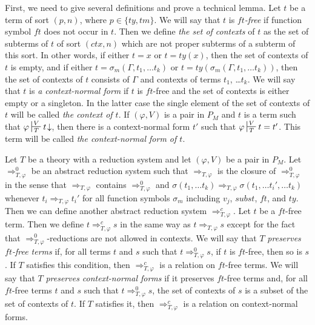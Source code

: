 \documentclass[reqno]{amsart}
\theoremstyle{definition}
\theoremstyle{remark}
\newcommand{\subst}{\mathit{subst}}
\newcommand{\ft}{\mathit{ft}}
\newcommand{\ty}{\mathit{ty}}
\newcommand{\ctx}{\mathit{ctx}}
\newcommand{\tm}{\mathit{tm}}
\numberwithin{figure}{section}
\begin{document}
First, we need to give several definitions and prove a technical lemma.
Let $t$ be a term of sort $(p,n)$, where $p \in \{ \ty, \tm \}$.
We will say that $t$ is \emph{$\ft$-free} if function symbol $\ft$ does not occur in $t$.
Then we define \emph{the set of contexts} of $t$ as the set of subterms of $t$ of sort $(\ctx,n)$ which are not proper subterms of a subterm of this sort.
In other words, if either $t = x$ or $t = \ty(x)$, then the set of contexts of $t$ is empty,
and if either $t = \sigma_m(\Gamma, t_1, \ldots t_k)$ or $t = \ty(\sigma_m(\Gamma, t_1, \ldots t_k))$, then the set of contexts of $t$ consists of $\Gamma$ and contexts of terms $t_1$, \ldots $t_k$.
We will say that $t$ is \emph{a context-normal form} if $t$ is $\ft$-free and the set of contexts is either empty or a singleton.
In the latter case the single element of the set of contexts of $t$ will be called \emph{the context of $t$}.
If $(\varphi,V)$ is a pair in $P_M$ and $t$ is a term such that $\varphi \sststile{T}{V} t\!\downarrow$, then there is a context-normal form $t'$ such that $\varphi \sststile{T}{V} t = t'$.
This term will be called \emph{the context-normal form of $t$}.

Let $T$ be a theory with a reduction system and let $(\varphi,V)$ be a pair in $P_M$.
Let $\Rightarrow_{T,\varphi}^0$ be an abstract reduction system such that $\Rightarrow_{T,\varphi}$ is the closure of $\Rightarrow_{T,\varphi}^0$ in the sense that $\Rightarrow_{T,\varphi}$ contains $\Rightarrow_{T,\varphi}^0$
and $\sigma(t_1, \ldots t_k) \Rightarrow_{T,\varphi} \sigma(t_1, \ldots t_i', \ldots t_k)$ whenever $t_i \Rightarrow_{T,\varphi} t_i'$ for all function symbols $\sigma_m$ including $v_j$, $\subst$, $\ft$, and $\ty$.
Then we can define another abstract reduction system $\Rightarrow_{T,\varphi}^c$.
Let $t$ be a $\ft$-free term.
Then we define $t \Rightarrow_{T,\varphi}^c s$ in the same way as $t \Rightarrow_{T,\varphi} s$ except for the fact that $\Rightarrow_{T,\varphi}^0$-reductions are not allowed in contexts.
We will say that $T$ \emph{preserves $\ft$-free terms} if, for all terms $t$ and $s$ such that $t \Rightarrow_{T,\varphi}^0 s$, if $t$ is $\ft$-free, then so is $s$.
If $T$ satisfies this condition, then $\Rightarrow_{T,\varphi}^c$ is a relation on $\ft$-free terms.
We will say that $T$ \emph{preserves context-normal forms} if it preserves $\ft$-free terms and, for all $\ft$-free terms $t$ and $s$ such that $t \Rightarrow_{T,\varphi}^0 s$, the set of contexts of $s$ is a subset of the set of contexts of $t$.
If $T$ satisfies it, then $\Rightarrow_{T,\varphi}^c$ is a relation on context-normal forms.
\end{document}

